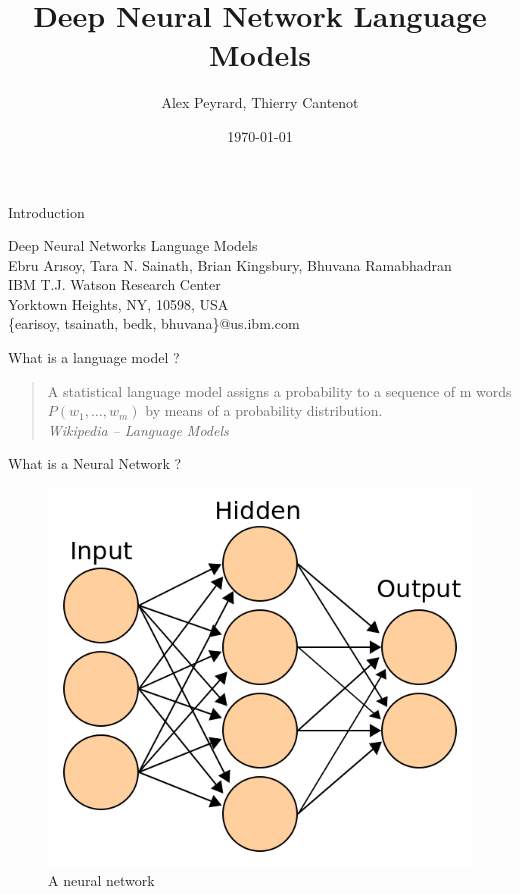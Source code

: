 \documentclass{beamer}
\title[DNNLM]{Deep Neural Network Language Models}
\author[A. Peyrard, T. Cantenot]{Alex Peyrard, Thierry Cantenot}
\institute{Shanghai JiaoTong University}
\date{\today}
\begin{document}
\begin{frame}[plain]
	  \titlepage
\end{frame}
\begin{frame}{Introduction}
\begin{center}
Deep Neural Networks Language Models\\
Ebru Arısoy, Tara N. Sainath, Brian Kingsbury, Bhuvana Ramabhadran\\
IBM T.J. Watson Research Center\\
Yorktown Heights, NY, 10598, USA\\
\{earisoy, tsainath, bedk, bhuvana\}@us.ibm.com
\end{center}

\end{frame}

\begin{frame}{What is a language model ?}
\begin{quote}
A statistical language model assigns a probability to a sequence of m words $P(w_1,\ldots,w_m)$ by means of a probability distribution. \\ \flushright\emph{Wikipedia -- Language Models}
\end{quote}
\end{frame}
\begin{frame}{What is a Neural Network ?}
\begin{figure}[!ht]
	\centering
	\rule{0cm}{0cm}
    \includegraphics[width=0.5\linewidth]{./images/ANN.png}
	\caption{A neural network}
\end{figure}
\end{frame}
\end{document}

